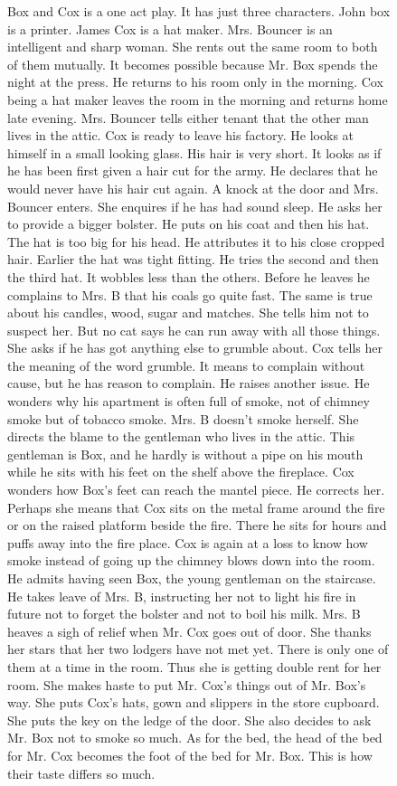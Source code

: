 {\begin{figure}[p]
    Box and Cox is a one act play.  It has just three characters.  John box is a printer.  James Cox is a hat maker.  Mrs. Bouncer is an intelligent and sharp woman.  She rents out the same room to both of them mutually.  It becomes possible because Mr. Box spends the night at the press.  He returns to his room only in the morning.  Cox being a hat maker leaves the room in the morning and returns home late evening.  Mrs. Bouncer tells either tenant that the other man lives in the attic.  Cox is ready to leave his factory.  He looks at himself in a small looking glass. His hair is very short.  It looks as if he has been first given a hair cut for the army.  He declares that he would never have his hair cut again.  A knock at the door and Mrs. Bouncer enters.  She enquires if he has had sound sleep.  He asks her to provide a bigger bolster.  He puts on his coat and then his hat.  The hat is too big for his head.  He attributes it to his close cropped hair.  Earlier the hat was tight fitting.  He tries the second and then the third hat. It wobbles less than the others.  Before he leaves he complains to Mrs. B that his coals go quite fast.  The same is true about his candles, wood, sugar and matches. She tells him not to suspect her.  But no cat says he can run away with all those things.  She asks if he has got anything else to grumble about. Cox tells her the meaning of the word grumble.  It means to complain without cause, but he has reason to complain.  He raises another issue. He wonders why his apartment is often full of smoke, not of chimney smoke but of tobacco smoke.  Mrs. B doesn't smoke herself. She directs the blame to the gentleman who lives in the attic.  This gentleman is Box, and he hardly is without a pipe on his mouth while he sits with his feet on the shelf above the fireplace.  Cox wonders how Box's feet can reach the mantel piece.  He corrects her.
    Perhaps she means that Cox sits on the metal frame around the fire or on the raised platform beside the fire. 
    There he sits for hours and puffs away into the fire place. 
    Cox is again at a loss to know how smoke instead of going up the chimney blows down into the room. He admits having seen Box, the young gentleman on the staircase. He takes leave of Mrs. B, instructing her not to light his fire in future not to forget the bolster and not to boil his milk. Mrs. B heaves a sigh of relief when Mr. Cox goes out of door. She thanks her stars that her two lodgers have not met yet. There is only one of them at a time in the room. Thus she is getting double rent for her room. She makes haste to put Mr. Cox's things out of Mr. Box's way. She puts Cox's hats, gown and slippers in the store cupboard. She puts the key on the ledge of the door. She also decides to ask Mr. Box not to smoke so much. As for the bed, the head of the bed for Mr. Cox becomes the foot of the bed for Mr. Box. This is how their taste differs so much.


\end{figure}}
